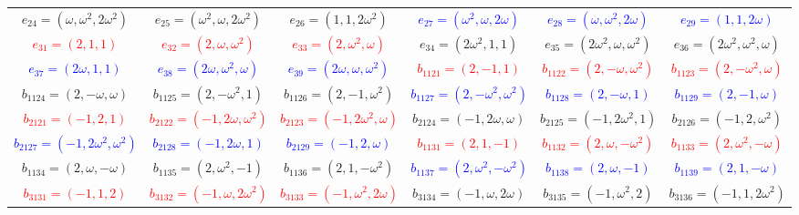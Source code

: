 \documentclass[%
  reprint,
  superscriptaddress,
  showpacs,
  showkeys,
  amsmath,amssymb,
  pra,
  longbibliography,
  floatfix,
  x11names
]{revtex4-2}
\begin{document}
\begin{table}[htbp!]
\begin{ruledtabular}
\begin{tabular}{*{6}{c}}
\textcolor{green!40!black}{$e_{24}=(\omega,\omega^2,2\omega^2)$} & \textcolor{green!40!black}{$e_{25}=(\omega^2,\omega,2\omega^2)$} & \textcolor{green!40!black}{$e_{26}=(1,1,2\omega^2)$} & \textcolor{blue}{$e_{27}=(\omega^2,\omega,2\omega)$} & \textcolor{blue}{$e_{28}=(\omega,\omega^2,2\omega)$} & \textcolor{blue}{$e_{29}=(1,1,2\omega)$} \\
\textcolor{red}{$e_{31}=(2,1,1)$} & \textcolor{red}{$e_{32}=(2,\omega,\omega^2)$} & \textcolor{red}{$e_{33}=(2,\omega^2,\omega)$} & \textcolor{green!40!black}{$e_{34}=(2\omega^2,1,1)$} & \textcolor{green!40!black}{$e_{35}=(2\omega^2,\omega,\omega^2)$} & \textcolor{green!40!black}{$e_{36}=(2\omega^2,\omega^2,\omega)$} \\
\textcolor{blue}{$e_{37}=(2\omega,1,1)$} & \textcolor{blue}{$e_{38}=(2\omega,\omega^2,\omega)$} & \textcolor{blue}{$e_{39}=(2\omega,\omega,\omega^2)$} & \textcolor{red}{$b_{1121}=(2,-1,1)$} & \textcolor{red}{$b_{1122}=(2,-\omega,\omega^2)$} & \textcolor{red}{$b_{1123}=(2,-\omega^2,\omega)$} \\
\textcolor{green!40!black}{$b_{1124}=(2,-\omega,\omega)$} & \textcolor{green!40!black}{$b_{1125}=(2,-\omega^2,1)$} & \textcolor{green!40!black}{$b_{1126}=(2,-1,\omega^2)$} & \textcolor{blue}{$b_{1127}=(2,-\omega^2,\omega^2)$} & \textcolor{blue}{$b_{1128}=(2,-\omega,1)$} & \textcolor{blue}{$b_{1129}=(2,-1,\omega)$} \\
\textcolor{red}{$b_{2121}=(-1,2,1)$} & \textcolor{red}{$b_{2122}=(-1,2\omega,\omega^2)$} & \textcolor{red}{$b_{2123}=(-1,2\omega^2,\omega)$} & \textcolor{green!40!black}{$b_{2124}=(-1,2\omega,\omega)$} & \textcolor{green!40!black}{$b_{2125}=(-1,2\omega^2,1)$} & \textcolor{green!40!black}{$b_{2126}=(-1,2,\omega^2)$} \\
\textcolor{blue}{$b_{2127}=(-1,2\omega^2,\omega^2)$} & \textcolor{blue}{$b_{2128}=(-1,2\omega,1)$} & \textcolor{blue}{$b_{2129}=(-1,2,\omega)$} & \textcolor{red}{$b_{1131}=(2,1,-1)$} & \textcolor{red}{$b_{1132}=(2,\omega,-\omega^2)$} & \textcolor{red}{$b_{1133}=(2,\omega^2,-\omega)$} \\
\textcolor{green!40!black}{$b_{1134}=(2,\omega,-\omega)$} & \textcolor{green!40!black}{$b_{1135}=(2,\omega^2,-1)$} & \textcolor{green!40!black}{$b_{1136}=(2,1,-\omega^2)$} & \textcolor{blue}{$b_{1137}=(2,\omega^2,-\omega^2)$} & \textcolor{blue}{$b_{1138}=(2,\omega,-1)$} & \textcolor{blue}{$b_{1139}=(2,1,-\omega)$} \\
\textcolor{red}{$b_{3131}=(-1,1,2)$} & \textcolor{red}{$b_{3132}=(-1,\omega,2\omega^2)$} & \textcolor{red}{$b_{3133}=(-1,\omega^2,2\omega)$} & \textcolor{green!40!black}{$b_{3134}=(-1,\omega,2\omega)$} & \textcolor{green!40!black}{$b_{3135}=(-1,\omega^2,2)$} & \textcolor{green!40!black}{$b_{3136}=(-1,1,2\omega^2)$} \\

\end{tabular}
\end{ruledtabular}
\end{table}
\end{document}
